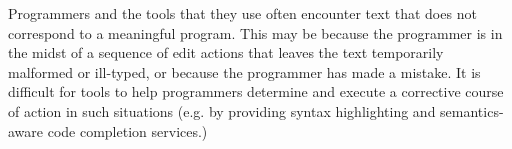 






Programmers and the tools that they use often encounter text that does not correspond to a meaningful program. This may be because the programmer is in the midst of a sequence of 
edit actions that leaves the text temporarily malformed or ill-typed, or because the programmer has made a mistake. It is difficult for tools to help programmers determine and execute a corrective course of action in such situations (e.g. by providing syntax highlighting and semantics-aware code completion services.) %

